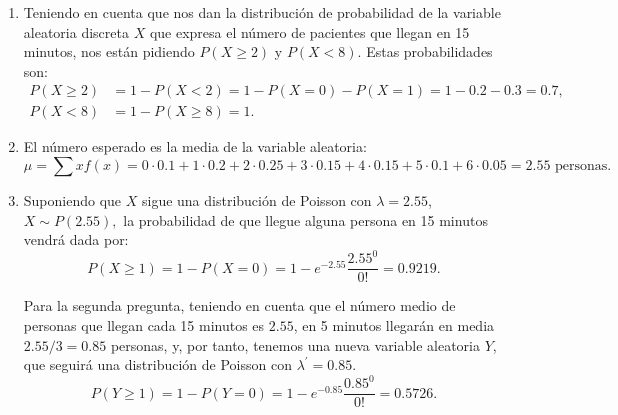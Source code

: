 {\begin{enumerate}
\item Teniendo en cuenta que nos dan la distribución de probabilidad de la variable aleatoria discreta $X$ que expresa el número de
pacientes que llegan en 15 minutos, nos están pidiendo $P(X\geq 2)$ y $P(X<8)$. Estas probabilidades son:
\begin{align*}
P(X\geq 2) & =1-P(X<2)=1-P(X=0)-P(X=1)=1-0.2-0.3=0.7,\\
P(X<8)& =1-P(X\geq 8)=1.
\end{align*}
\item El número esperado es la media de la variable aleatoria:
\[
\mu =\sum xf(x)=0\cdot 0.1+1\cdot 0.2+2\cdot 0.25+3\cdot 0.15+4\cdot 0.15+5\cdot 0.1+6\cdot 0.05=2.55 \text{ personas}.
\]

\item Suponiendo que $X$ sigue una distribución de Poisson con $\lambda =2.55$, $X\sim P(2.55),$ la probabilidad de que llegue alguna
persona en 15 minutos vendrá dada por:
\[
P(X\geq 1)=1-P(X=0)=1-e^{-2.55}\dfrac{2.55^{0}}{0!}=0.9219.
\]

Para la segunda pregunta, teniendo en cuenta que el número medio de personas que llegan cada 15 minutos es $2.55$, en 5 minutos llegarán en
media $2.55/3 = 0.85$ personas, y, por tanto, tenemos una nueva variable aleatoria $Y$, que seguirá una distribución de Poisson con $\lambda
^{\prime }=0.85.$
\[
P(Y\geq 1)=1-P(Y=0)=1-e^{-0.85}\dfrac{0.85^{0}}{0!}=0.5726.
\]
\end{enumerate}
}


